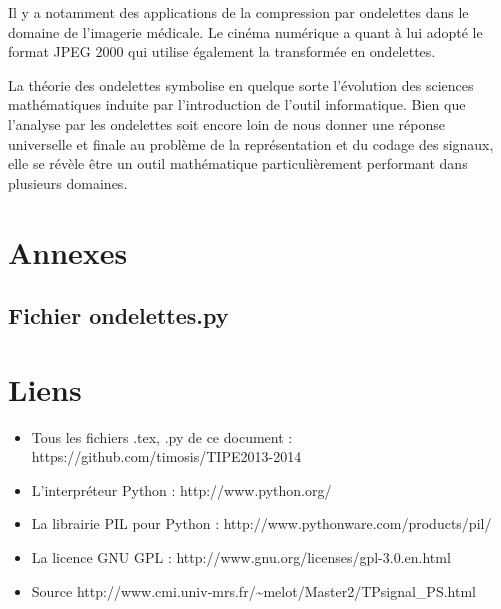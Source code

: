 \documentclass{article}
\begin{document}
Il y a notamment des applications de la compression par ondelettes dans le domaine de l’imagerie médicale. Le cinéma numérique a quant à lui adopté le format JPEG 2000 qui utilise également la transformée en ondelettes. 

La théorie des ondelettes symbolise en quelque sorte l’évolution des sciences mathématiques induite par l’introduction de l’outil informatique. 
Bien que l’analyse par les ondelettes soit encore loin de nous donner une réponse universelle et finale au problème de la représentation et du codage des signaux, elle se révèle être un outil mathématique particulièrement performant dans plusieurs domaines. 




\section{Annexes}

\subsection{Fichier ondelettes.py}



\section{Liens}

\begin{itemize}
\item Tous les fichiers .tex, .py de ce document : https://github.com/timosis/TIPE2013-2014

\item L'interpréteur Python : http://www.python.org/

\item La librairie PIL pour Python : http://www.pythonware.com/products/pil/

\item La licence GNU GPL : http://www.gnu.org/licenses/gpl-3.0.en.html


\item Source http://www.cmi.univ-mrs.fr/\textasciitilde{}melot/Master2/TPsignal\_PS.html
\end{itemize}
\end{document}
